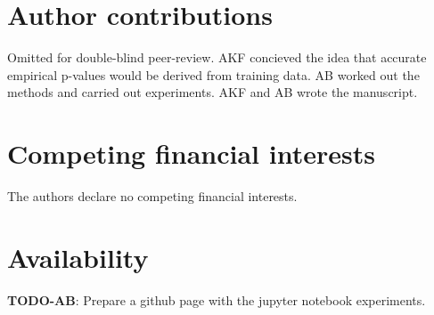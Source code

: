 \documentclass{article}
\newcommand{\todo}[2]{{\color{red} {\bf TODO-#1}: #2}}
\begin{document}
%


\section*{Author contributions}
\ifdefined\DOUBLEBLINDREVIEW
Omitted for double-blind peer-review.
\else
AKF concieved the idea that accurate empirical p-values would be derived from training data. AB worked out the methods and carried out experiments. AKF and AB wrote the manuscript.
\fi

\section*{Competing financial interests}
The authors declare no competing financial interests.


\section*{Availability}
\todo{AB}{Prepare a github page with the jupyter notebook experiments.}
\end{document}
